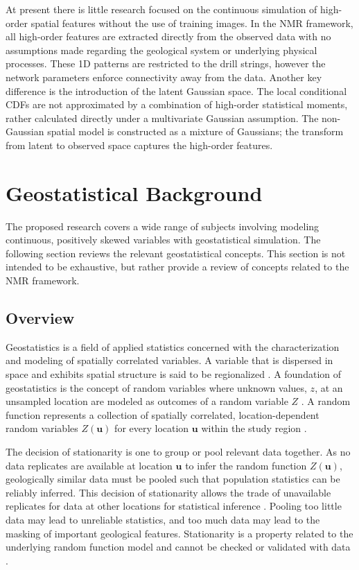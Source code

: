 At present there is little research focused on the continuous simulation of high-order spatial features without the use of training images. In the \gls{NMR} framework, all high-order features are extracted directly from the observed data with no assumptions made regarding the geological system or underlying physical processes. These \gls{1D} patterns are restricted to the drill strings, however the network parameters enforce connectivity away from the data. Another key difference is the introduction of the latent Gaussian space. The local conditional \glspl{CDF} are not approximated by a combination of high-order statistical moments, rather calculated directly under a multivariate Gaussian assumption. The non-Gaussian spatial model is constructed as a mixture of Gaussians; the transform from latent to observed space captures the high-order features.


\FloatBarrier
\section{Geostatistical Background}
\label{sec:01geostatreview}

The proposed research covers a wide range of subjects involving modeling continuous, positively skewed variables with geostatistical simulation. The following section reviews the relevant geostatistical concepts. This section is not intended to be exhaustive, but rather provide a review of concepts related to the \gls{NMR} framework.

\FloatBarrier
\subsection{Overview}
\label{subsec:01overview}

Geostatistics is a field of applied statistics concerned with the characterization and modeling of spatially correlated variables. A variable that is dispersed in space and exhibits spatial structure is said to be regionalized \citep{matheron2019matheron}. A foundation of geostatistics is the concept of random variables where unknown values, $z$, at an unsampled location are modeled as outcomes of a random variable $Z$ \citep{deutsch1992geostatistical}. A random function represents a collection of spatially correlated, location-dependent random variables $Z(\mathbf{u})$ for every location $\mathbf{u}$ within the study region \citep{goovaerts1997geostatistics}.

The decision of stationarity is one to group or pool relevant data together. As no data replicates are available at location $\mathbf{u}$ to infer the random function $Z(\mathbf{u})$, geologically similar data must be pooled such that population statistics can be reliably inferred. This decision of stationarity allows the trade of unavailable replicates for data at other locations for statistical inference \citep{deutsch1992geostatistical}. Pooling too little data may lead to unreliable statistics, and too much data may lead to the masking of important geological features. Stationarity is a property related to the underlying random function model and cannot be checked or validated with data \citep{goovaerts1997geostatistics}.

